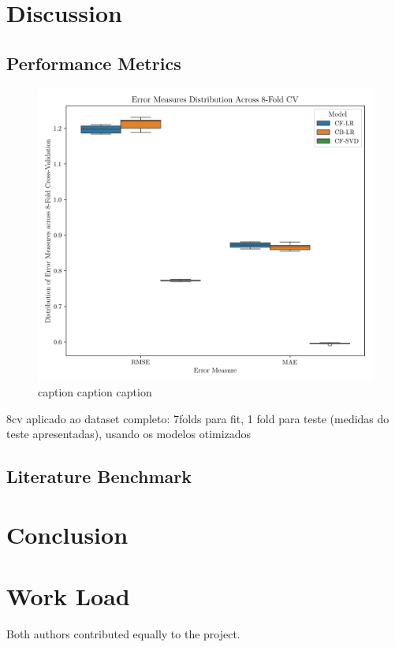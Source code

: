 \documentclass[conference]{IEEEtran}
\begin{document}
\section{Discussion} 

\subsection{Performance Metrics}

\begin{figure}[H]
    \centering
    \includegraphics[width=1\linewidth]{assets/results_boxplot.png}
    \caption{caption caption caption}
    \label{fig:results_boxplot}
\end{figure}

8cv aplicado ao dataset completo: 7folds para fit, 1 fold para teste (medidas do teste apresentadas), usando os modelos otimizados


\subsection{Literature Benchmark}


\section{Conclusion}


\section*{Work Load}

Both authors contributed equally to the project.






\end{document}

